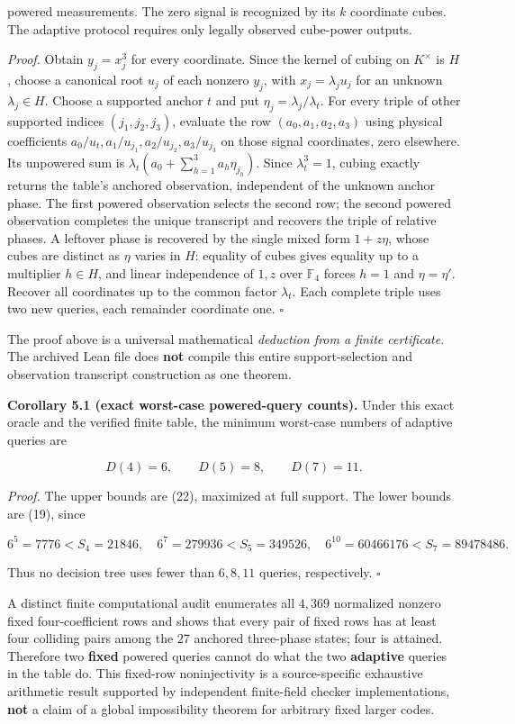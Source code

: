 \documentclass[
  10pt,
]{article}
\begin{document}
powered measurements. The zero signal is recognized by its \(k\)
coordinate cubes. The adaptive protocol requires only legally observed
cube-power outputs.

\emph{Proof.} Obtain \(y_j=x_j^3\) for every coordinate. Since the
kernel of cubing on \(K^\times\) is \(H\), choose a canonical root
\(u_j\) of each nonzero \(y_j\), with \(x_j=\lambda_j u_j\) for an
unknown \(\lambda_j\in H\). Choose a supported anchor \(t\) and put
\(\eta_j=\lambda_j/\lambda_t\). For every triple of other supported
indices \((j_1,j_2,j_3)\), evaluate the row \((a_0,a_1,a_2,a_3)\) using
physical coefficients \(a_0/u_t,a_1/u_{j_1},a_2/u_{j_2},a_3/u_{j_3}\) on
those signal coordinates, zero elsewhere. Its unpowered sum is
\(\lambda_t(a_0+\sum_{h=1}^3a_h\eta_{j_h})\). Since \(\lambda_t^3=1\),
cubing exactly returns the table's anchored observation, independent of
the unknown anchor phase. The first powered observation selects the
second row; the second powered observation completes the unique
transcript and recovers the triple of relative phases. A leftover phase
is recovered by the single mixed form \(1+z\eta\), whose cubes are
distinct as \(\eta\) varies in \(H\): equality of cubes gives equality
up to a multiplier \(h\in H\), and linear independence of \(1,z\) over
\(\mathbb F_4\) forces \(h=1\) and \(\eta=\eta'\). Recover all
coordinates up to the common factor \(\lambda_t\). Each complete triple
uses two new queries, each remainder coordinate one. \(\square\)

The proof above is a universal mathematical \emph{deduction from a
finite certificate}. The archived Lean file does \textbf{not} compile
this entire support-selection and observation transcript construction as
one theorem.

\textbf{Corollary 5.1 (exact worst-case powered-query counts).} Under
this exact oracle and the verified finite table, the minimum worst-case
numbers of adaptive queries are

\[
\boxed{D(4)=6,\qquad D(5)=8,\qquad D(7)=11.} \tag{23}
\]

\emph{Proof.} The upper bounds are (22), maximized at full support. The
lower bounds are (19), since

\[
6^5=7776<S_4=21846,\quad
6^7=279936<S_5=349526,\quad
6^{10}=60466176<S_7=89478486.
\]

Thus no decision tree uses fewer than \(6,8,11\) queries, respectively.
\(\square\)

A distinct finite computational audit enumerates all \(4,369\)
normalized nonzero fixed four-coefficient rows and shows that every pair
of fixed rows has at least four colliding pairs among the \(27\)
anchored three-phase states; four is attained. Therefore two
\textbf{fixed} powered queries cannot do what the two \textbf{adaptive}
queries in the table do. This fixed-row noninjectivity is a
source-specific exhaustive arithmetic result supported by independent
finite-field checker implementations, \textbf{not} a claim of a global
impossibility theorem for arbitrary fixed larger codes.
\end{document}
